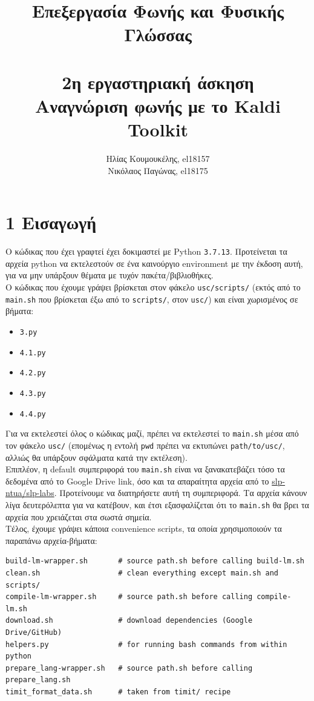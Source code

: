\documentclass[a4paper, 12pt]{article}
\title{
	\textbf{Επεξεργασία Φωνής και Φυσικής Γλώσσας} \\~\\
	2η εργαστηριακή άσκηση \\ 
	Αναγνώριση φωνής με το Kaldi Toolkit
}
\author{
	Ηλίας Κουμουκέλης, el18157 \\
	Νικόλαος Παγώνας, el18175
}
\date{}
\begin{document}
\maketitle
        
\section*{1 Εισαγωγή}
    Ο κώδικας που έχει γραφτεί έχει δοκιμαστεί με Python \verb|3.7.13|. Προτείνεται τα αρχεία python να εκτελεστούν σε ένα καινούργιο environment με την έκδοση αυτή, για να μην υπάρξουν θέματα με τυχόν πακέτα/βιβλιοθήκες. \\
    
    Ο κώδικας που έχουμε γράψει βρίσκεται στον φάκελο \verb|usc/scripts/| (εκτός από το \verb|main.sh| που βρίσκεται έξω από το \verb|scripts/|, στον \verb|usc/|) και είναι χωρισμένος σε βήματα:
    
    \begin{itemize}
        \item \verb|3.py|
        \item \verb|4.1.py|
        \item \verb|4.2.py|
        \item \verb|4.3.py|
        \item \verb|4.4.py|
    \end{itemize}
    
    Για να εκτελεστεί όλος ο κώδικας μαζί, πρέπει να εκτελεστεί το \verb|main.sh| μέσα από τον φάκελο \verb|usc/| (επομένως η εντολή \verb|pwd| πρέπει να εκτυπώνει \verb|path/to/usc/|, αλλιώς θα υπάρξουν σφάλματα κατά την εκτέλεση). \\
    
    Επιπλέον, η default συμπεριφορά του \verb|main.sh| είναι να ξανακατεβάζει τόσο τα δεδομένα από το Google Drive link, όσο και τα απαραίτητα αρχεία από το \href{https://github.com/slp-ntua/slp-labs/}{slp-ntua/slp-labs}. Προτείνουμε να διατηρήσετε αυτή τη συμπεριφορά. Τα αρχεία κάνουν λίγα δευτερόλεπτα για να κατέβουν, και έτσι εξασφαλίζεται ότι το \verb|main.sh| θα βρει τα αρχεία που χρειάζεται στα σωστά σημεία. \\
    
    Τέλος, έχουμε γράψει κάποια convenience scripts, τα οποία χρησιμοποιούν τα παραπάνω αρχεία-βήματα:
    
    \begin{verbatim}
build-lm-wrapper.sh       # source path.sh before calling build-lm.sh
clean.sh                  # clean everything except main.sh and scripts/
compile-lm-wrapper.sh     # source path.sh before calling compile-lm.sh
download.sh               # download dependencies (Google Drive/GitHub)
helpers.py                # for running bash commands from within python
prepare_lang-wrapper.sh   # source path.sh before calling prepare_lang.sh
timit_format_data.sh      # taken from timit/ recipe
    \end{verbatim}
\end{document}
